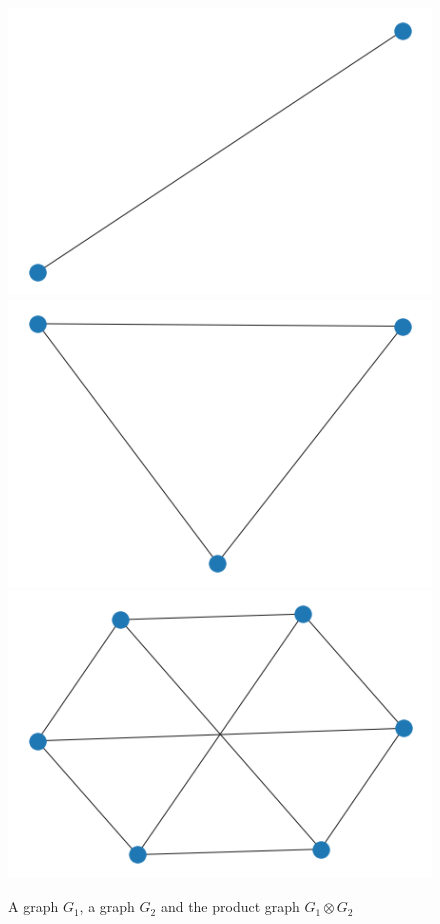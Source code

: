 \documentclass{article}
\theoremstyle{definition}
\begin{document}
\begin{figure}
	\begin{multicols}{3}
		\includegraphics[width=\linewidth]{data/prod_graph/g1.png}
		\includegraphics[width=\linewidth]{data/prod_graph/g2.png}
		\includegraphics[width=\linewidth]{data/prod_graph/gx.png}
	\end{multicols}
	\caption{A graph $G_1$, a graph $G_2$ and the product graph $G_1 \otimes G_2$}
\end{figure}
\end{document}
